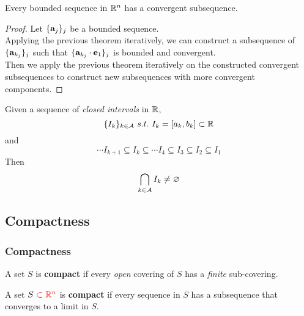 \documentclass[11pt]{article}
\begin{document}
		    \begin{theorem}
		        Every bounded sequence in $\mathbb{R}^n$ has a convergent subsequence.
		        \begin{proof}
		        	Let $\{\textbf{a}_j\}_j$ be a bounded sequence. \\
		        	Applying the previous theorem iteratively, we can construct a subsequence of $\{\textbf{a}_{k_j}\}_j$ such that $\{\textbf{a}_{k_j} \cdot \textbf{e}_1\}_{j}$ is bounded and convergent. \\
		        	Then we apply the previous theorem iteratively on the constructed convergent subsequences to construct new subsequences with more convergent components.
		        \end{proof}
		    \end{theorem}
		    
		    \begin{theorem}
		    	Given a sequence of \emph{closed intervals} in $\mathbb{R}$,
		    	\begin{equation}
		    		\{I_k\}_{k \in \mathcal{{A}}}\ s.t.\ I_k = [a_k, b_k] \subset \mathbb{R}
		    	\end{equation}
		    	and 
		    	\begin{equation}
		    		\cdots I_{k+1} \subseteq I_{k} \subseteq \cdots I_4 \subseteq I_3 \subseteq I_2 \subseteq I_1
		    	\end{equation}
		    	Then
		    	\begin{equation}
		    		\bigcap_{k \in \mathcal{{A}}}I_k \neq \varnothing
		    	\end{equation}
		    \end{theorem}
		    
		\subsection{Compactness}
			\subsubsection{Compactness}
				\begin{definition}
					A set $S$ is \textbf{compact} if every \emph{open} covering of $S$ has a \emph{finite} sub-covering.
				\end{definition}
				
				\begin{definition}
					A set $S\ \textcolor{red}{\subset \mathbb{R}^n}$ is \textbf{compact} if every sequence in $S$ has a subsequence that converges to a limit in $S$.
				\end{definition}
				
\end{document}

